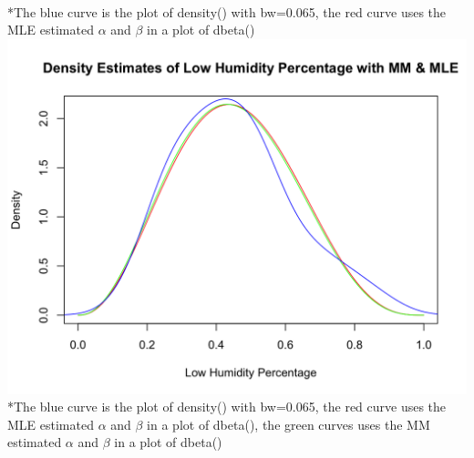\documentclass[12pt, letterpaper]{article}
\begin{document}
\footnotesize
\\ \**The blue curve is the plot of density() with bw=0.065, the red curve uses the MLE estimated ${\alpha}$ and ${\beta}$ in a plot of dbeta() \\
\includegraphics[scale=0.32]{austinweather_mmmle.png}
\footnotesize
\\ \**The blue curve is the plot of density() with bw=0.065, the red curve uses the MLE estimated ${\alpha}$ and ${\beta}$ in a plot of dbeta(), the green curves uses the MM estimated ${\alpha}$ and ${\beta}$ in a plot of dbeta() \\
\end{document}
